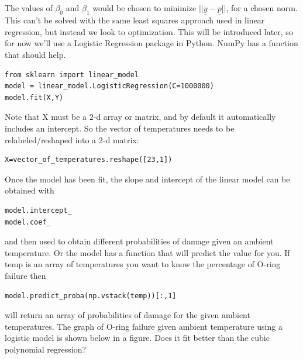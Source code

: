 
The values of $\beta_0$ and $\beta_1$ would be chosen to minimize $||\underline{y} - \underline{p}||$, for a chosen norm.
This can't be solved with the same least squares approach used in linear regression, but instead we look to optimization.
This will be introduced later, so for now we'll use a Logistic Regression package in Python. 
NumPy has a function  that should help.
\begin{lstlisting}
from sklearn import linear_model 
model = linear_model.LogisticRegression(C=1000000)
model.fit(X,Y)
\end{lstlisting}

Note that X must be a 2-d array or matrix, and by default it automatically includes an intercept.
So the vector of temperatures needs to be relabeled/reshaped into a 2-d matrix:
\begin{lstlisting}
X=vector_of_temperatures.reshape([23,1])
\end{lstlisting}

Once the model has been fit, the slope and intercept of the linear model can be obtained with
\begin{lstlisting}
model.intercept_
model.coef_
\end{lstlisting} 
and then used to obtain different probabilities of damage given an ambient temperature.
Or the model has a function that will predict the value for you. If temp is an array of temperatures you want to know the percentage of O-ring failure then
\begin{lstlisting}
model.predict_proba(np.vstack(temp))[:,1]
\end{lstlisting} 
will return an array of probabilities of damage for the given ambient temperatures. The graph of O-ring failure given ambient temperature using a logistic model is shown below in a figure. Does it fit better than the cubic polynomial regression?  

